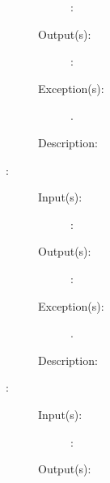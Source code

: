 \begin{description}
\begin{description}
\begin{description}
		\item[: ]
		\end{description}
	\item[Output(s): ]
		\begin{description}\item[]
		\item[: ]
		\end{description}
	\item[Exception(s): ]
		\begin{description}\item[]
		\item[.]
		\end{description}
	\item[Description: ]
	\end{description}
\label{thd_}
\item[{\cfunc[]{thd\_}{}}: ]
	\begin{description}\item[]
	\item[Input(s): ]
		\begin{description}\item[]
		\item[: ]
		\end{description}
	\item[Output(s): ]
		\begin{description}\item[]
		\item[: ]
		\end{description}
	\item[Exception(s): ]
		\begin{description}\item[]
		\item[.]
		\end{description}
	\item[Description: ]
	\end{description}
\label{thd_}
\item[{\cfunc[]{thd\_}{}}: ]
	\begin{description}\item[]
	\item[Input(s): ]
		\begin{description}\item[]
		\item[: ]
		\end{description}
	\item[Output(s): ]

\end{description}
\end{description}
